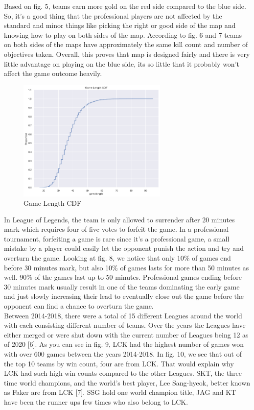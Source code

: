 \documentclass[conference]{IEEEtran}
\begin{document}
Based on fig. 5, teams earn more gold on the red side compared to the blue side. So, it's a good thing that the professional players are not affected by the standard and minor things like picking the right or good side of the map and knowing how to play on both sides of the map. According to fig. 6 and 7 teams on both sides of the maps have approximately the same kill count and number of objectives taken. Overall, this proves that map is designed fairly and there is very little advantage on playing on the blue side, its so little that it probably won't affect the game outcome heavily. 

\begin{figure}[!ht]
  \begin{center}
 \includegraphics[height=6cm]{graphics/cdf.png}
 \caption{Game Length CDF}
 \label{Game Length CDF}
 \end{center}
\end{figure}

In League of Legends, the team is only allowed to surrender after 20 minutes mark which requires four of five votes to forfeit the game. In a professional tournament, forfeiting a game is rare since it's a professional game, a small mistake by a player could easily let the opponent punish the action and try and overturn the game. Looking at fig. 8, we notice that only 10\% of games end before 30 minutes mark, but also 10\% of games lasts for more than 50 minutes as well. 90\% of the games last up to 50 minutes. Professional games ending before 30 minutes mark usually result in one of the teams dominating the early game and just slowly increasing their lead to eventually close out the game before the opponent can find a chance to overturn the game. \\

Between 2014-2018, there were a total of 15 different Leagues around the world with each consisting different number of teams. Over the years the Leagues have either merged or were shut down with the current number of Leagues being 12 as of 2020 [6]. As you can see in fig. 9, LCK had the highest number of games won with over 600 games between the years 2014-2018. In fig. 10, we see that out of the top 10 teams by win count, four are from LCK. That would explain why LCK had such high win counts compared to the other Leagues. SKT, the three-time world champions, and the world's best player, Lee Sang-hyeok, better known as Faker are from LCK [7]. SSG hold one world champion title, JAG and KT have been the runner ups few times who also belong to LCK.
\end{document}
